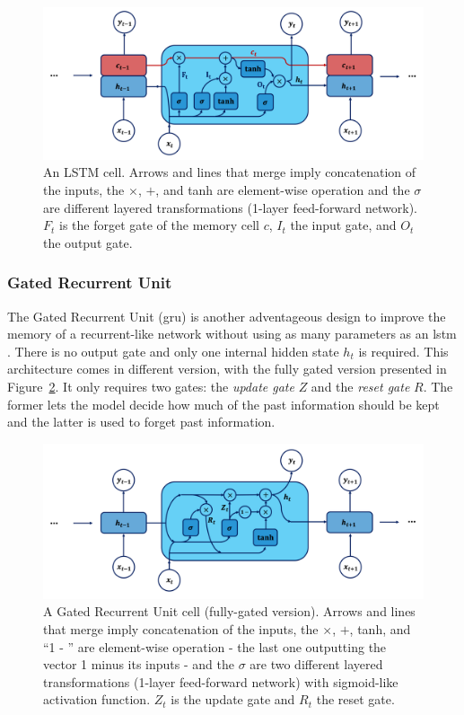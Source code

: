 \begin{figure}[h!]
    \center
    \includegraphics[scale=0.5]{Images/ML/lstm.png}
    \caption{An LSTM cell. Arrows and lines that merge imply concatenation of the inputs, the $\times$, $+$, and tanh are element-wise operation and the $\sigma$ are different layered transformations (1-layer feed-forward network). $F_t$ is the forget gate of the memory cell $c$, $I_t$ the input gate, and $O_t$ the output gate. } 
    \label{fig:lstmCell}
\end{figure}

\subsubsection{Gated Recurrent Unit} 
The Gated Recurrent Unit (\gls{gru}) is another adventageous design to improve the memory of a recurrent-like network without using as many parameters as an \gls{lstm} \cite{gruPaper}. There is no output gate and only one internal hidden state $h_t$ is required. This architecture comes in different version, with the fully gated version presented in Figure~\ref{fig:gruCell}. It only requires two gates: the \textit{update gate} $Z$ and the \textit{reset gate} $R$. The former lets the model decide how much of the past information should be kept and the latter is used to forget past information.

\begin{figure}[h!]
    \center
    \includegraphics[scale=0.5]{Images/ML/gru.png}
    \caption{A Gated Recurrent Unit cell (fully-gated version). Arrows and lines that merge imply concatenation of the inputs, the $\times$, $+$, tanh, and ``1 - '' are element-wise operation - the last one outputting the vector 1 minus its inputs - and the $\sigma$ are two different layered transformations (1-layer feed-forward network) with sigmoid-like activation function. $Z_t$ is the update gate and $R_t$ the reset gate. } 
    \label{fig:gruCell}
\end{figure}

